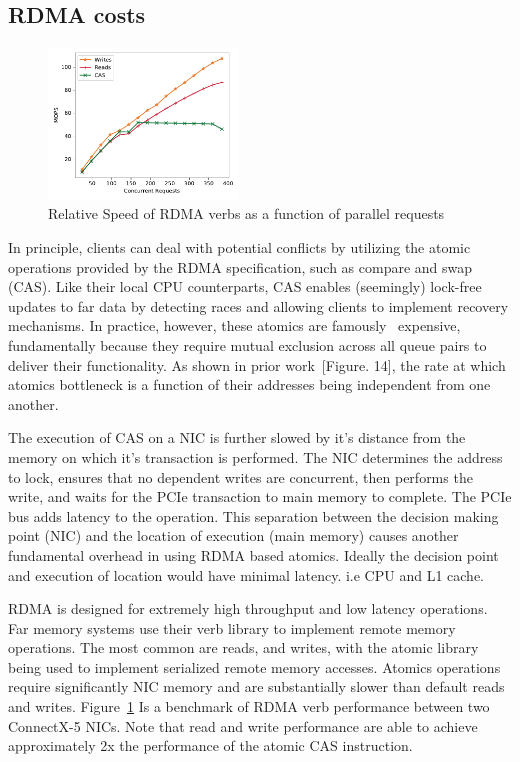 \subsection{RDMA costs}

\begin{figure}[t]
    \includegraphics[width=0.45\textwidth]{fig/rdma_concur.pdf}
    \caption{Relative Speed of RDMA verbs as a function of parallel requests}
    \label{fig:rdma_concur}
\end{figure}

In principle, clients can deal with potential conflicts by utilizing the atomic
operations provided by the RDMA specification, such as compare and swap (CAS).
Like their local CPU counterparts, CAS enables (seemingly) lock-free updates to
far data by detecting races and allowing clients to implement recovery
mechanisms. In practice, however, these atomics are
famously~\cite{design-guidelines,clover} expensive, fundamentally because they
require mutual exclusion across all queue pairs to deliver their functionality.
As shown in prior work~\cite{design-guidelines}[Figure. 14], the rate at which
atomics bottleneck is a function of their addresses being independent from one
another.

The execution of CAS on a NIC is further slowed by it's distance from the memory
on which it's transaction is performed. The NIC determines the address to lock,
ensures that no dependent writes are concurrent, then performs the write, and
waits for the PCIe transaction to main memory to complete. The PCIe bus adds
latency to the operation. This separation between the decision making point
(NIC) and the location of execution (main memory) causes another fundamental
overhead in using RDMA based atomics. Ideally the decision point and execution
of location would have minimal latency. i.e CPU and L1 cache.

RDMA is designed for extremely high throughput and low latency operations. Far
memory systems use their verb library to implement remote memory operations. The
most common are reads, and writes, with the atomic library being used to
implement serialized remote memory accesses. Atomics operations require
significantly NIC memory and are substantially slower than default reads and
writes. Figure~\ref{fig:rdma_concur} Is a benchmark of RDMA verb performance
between two ConnectX-5 NICs. Note that read and write performance are able to
achieve approximately 2x the performance of the atomic CAS instruction.

